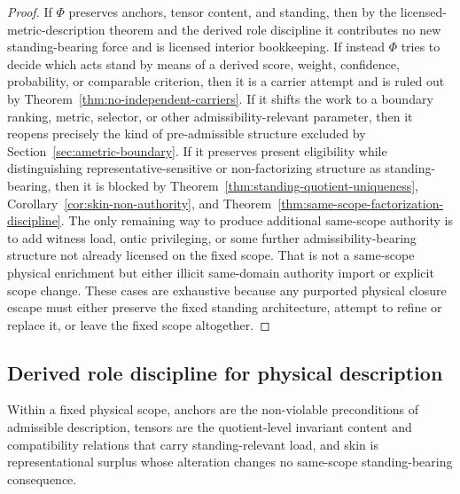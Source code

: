 \begin{proof}
If $\Phi$ preserves anchors, tensor content, and standing, then by the licensed-metric-description theorem and the derived role discipline it contributes no new standing-bearing force and is licensed interior bookkeeping. If instead $\Phi$ tries to decide which acts stand by means of a derived score, weight, confidence, probability, or comparable criterion, then it is a carrier attempt and is ruled out by Theorem~\ref{thm:no-independent-carriers}. If it shifts the work to a boundary ranking, metric, selector, or other admissibility-relevant parameter, then it reopens precisely the kind of pre-admissible structure excluded by Section~\ref{sec:ametric-boundary}. If it preserves present eligibility while distinguishing representative-sensitive or non-factorizing structure as standing-bearing, then it is blocked by Theorem~\ref{thm:standing-quotient-uniqueness}, Corollary~\ref{cor:skin-non-authority}, and Theorem~\ref{thm:same-scope-factorization-discipline}. The only remaining way to produce additional same-scope authority is to add witness load, ontic privileging, or some further admissibility-bearing structure not already licensed on the fixed scope. That is not a same-scope physical enrichment but either illicit same-domain authority import or explicit scope change. These cases are exhaustive because any purported physical closure escape must either preserve the fixed standing architecture, attempt to refine or replace it, or leave the fixed scope altogether.
\end{proof}


\subsection{Derived role discipline for physical description}

\begin{definition}
Within a fixed physical scope, anchors are the non-violable preconditions of admissible description, tensors are the quotient-level invariant content and compatibility relations that carry standing-relevant load, and skin is representational surplus whose alteration changes no same-scope standing-bearing consequence.
\end{definition}

